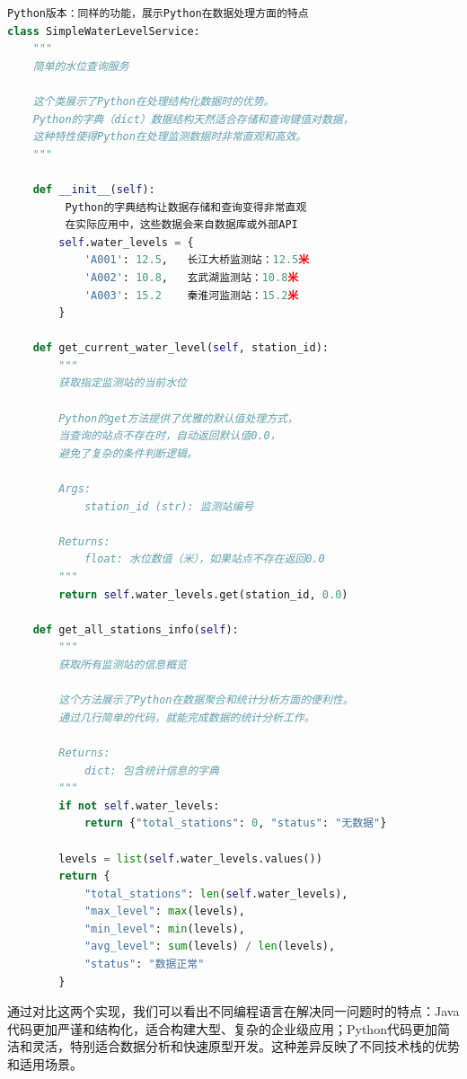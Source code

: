 \begin{lstlisting}[language=Python]
 Python版本：同样的功能，展示Python在数据处理方面的特点
class SimpleWaterLevelService:
    """
    简单的水位查询服务
    
    这个类展示了Python在处理结构化数据时的优势。
    Python的字典（dict）数据结构天然适合存储和查询键值对数据，
    这种特性使得Python在处理监测数据时非常直观和高效。
    """
    
    def __init__(self):
         Python的字典结构让数据存储和查询变得非常直观
         在实际应用中，这些数据会来自数据库或外部API
        self.water_levels = {
            'A001': 12.5,   长江大桥监测站：12.5米
            'A002': 10.8,   玄武湖监测站：10.8米
            'A003': 15.2    秦淮河监测站：15.2米
        }
    
    def get_current_water_level(self, station_id):
        """
        获取指定监测站的当前水位
        
        Python的get方法提供了优雅的默认值处理方式，
        当查询的站点不存在时，自动返回默认值0.0，
        避免了复杂的条件判断逻辑。
        
        Args:
            station_id (str): 监测站编号
            
        Returns:
            float: 水位数值（米），如果站点不存在返回0.0
        """
        return self.water_levels.get(station_id, 0.0)
    
    def get_all_stations_info(self):
        """
        获取所有监测站的信息概览
        
        这个方法展示了Python在数据聚合和统计分析方面的便利性。
        通过几行简单的代码，就能完成数据的统计分析工作。
        
        Returns:
            dict: 包含统计信息的字典
        """
        if not self.water_levels:
            return {"total_stations": 0, "status": "无数据"}
        
        levels = list(self.water_levels.values())
        return {
            "total_stations": len(self.water_levels),
            "max_level": max(levels),
            "min_level": min(levels),
            "avg_level": sum(levels) / len(levels),
            "status": "数据正常"
        }
\end{lstlisting}

通过对比这两个实现，我们可以看出不同编程语言在解决同一问题时的特点：Java代码更加严谨和结构化，适合构建大型、复杂的企业级应用；Python代码更加简洁和灵活，特别适合数据分析和快速原型开发。这种差异反映了不同技术栈的优势和适用场景。

